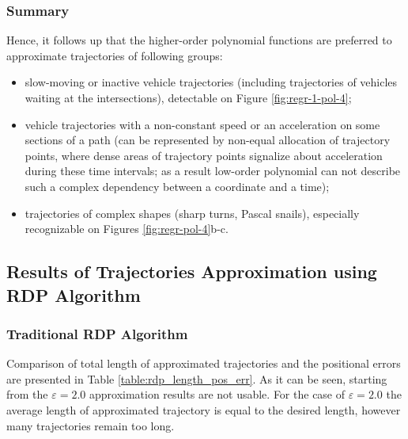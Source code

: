 \subsubsection{Summary}

Hence, it follows up that the higher-order polynomial functions are preferred to approximate trajectories of following groups:

\begin{itemize}
	\setlength\itemsep{0em}
	\item slow-moving or inactive vehicle trajectories (including trajectories of vehicles waiting at the intersections), detectable on Figure \ref{fig:regr-1-pol-4};
	\item vehicle trajectories with a non-constant speed or an acceleration on some sections of a path (can be represented by non-equal allocation of trajectory points, where dense areas of trajectory points signalize about acceleration during these time intervals; as a result low-order polynomial can not describe such a complex dependency between a coordinate and a time);
	\item trajectories of complex shapes (sharp turns, Pascal snails), especially recognizable on Figures \ref{fig:regr-pol-4}b-c.
\end{itemize}

\subsection{Results of Trajectories Approximation using RDP Algorithm}

\subsubsection{Traditional RDP Algorithm}

Comparison of total length of approximated trajectories and the positional errors are presented in Table \ref{table:rdp_length_pos_err}. As it can be seen, starting from the $\varepsilon = 2.0$ approximation results are not usable. For the case of $\varepsilon = 2.0$ the average length of approximated trajectory is equal to the desired length, however many trajectories remain too long.

